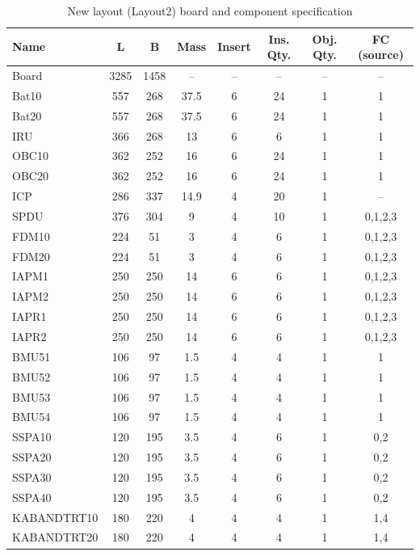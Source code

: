 \documentclass[11pt,a4paper,oneside]{report}
\begin{document}
\begin{table}[H]
\centering
\caption{New layout (Layout2) board and component specification}
\label{tab:layout_new}
\scriptsize
\begin{tabular}{|l|c|c|c|c|c|c|c|}
\hline
\textbf{Name} & \textbf{L} & \textbf{B} & \textbf{Mass} & \textbf{Insert} & \textbf{Ins. Qty.} & \textbf{Obj. Qty.} & \textbf{FC (source)} \\
\hline
Board & 3285 & 1458 & -- & -- & -- & -- & -- \\
\hline
Bat10 & 557 & 268 & 37.5 & 6 & 24 & 1 & 1 \\
\hline
Bat20 & 557 & 268 & 37.5 & 6 & 24 & 1 & 1 \\
\hline
IRU & 366 & 268 & 13 & 6 & 6 & 1 & 1 \\
\hline
OBC10 & 362 & 252 & 16 & 6 & 24 & 1 & 1 \\
\hline
OBC20 & 362 & 252 & 16 & 6 & 24 & 1 & 1 \\
\hline
ICP & 286 & 337 & 14.9 & 4 & 20 & 1 & -- \\
\hline
SPDU & 376 & 304 & 9 & 4 & 10 & 1 & 0,1,2,3 \\
\hline
FDM10 & 224 & 51 & 3 & 4 & 6 & 1 & 0,1,2,3 \\
\hline
FDM20 & 224 & 51 & 3 & 4 & 6 & 1 & 0,1,2,3 \\
\hline
IAPM1 & 250 & 250 & 14 & 6 & 6 & 1 & 0,1,2,3 \\
\hline
IAPM2 & 250 & 250 & 14 & 6 & 6 & 1 & 0,1,2,3 \\
\hline
IAPR1 & 250 & 250 & 14 & 6 & 6 & 1 & 0,1,2,3 \\
\hline
IAPR2 & 250 & 250 & 14 & 6 & 6 & 1 & 0,1,2,3 \\
\hline
BMU51 & 106 & 97 & 1.5 & 4 & 4 & 1 & 1 \\
\hline
BMU52 & 106 & 97 & 1.5 & 4 & 4 & 1 & 1 \\
\hline
BMU53 & 106 & 97 & 1.5 & 4 & 4 & 1 & 1 \\
\hline
BMU54 & 106 & 97 & 1.5 & 4 & 4 & 1 & 1 \\
\hline
SSPA10 & 120 & 195 & 3.5 & 4 & 6 & 1 & 0,2 \\
\hline
SSPA20 & 120 & 195 & 3.5 & 4 & 6 & 1 & 0,2 \\
\hline
SSPA30 & 120 & 195 & 3.5 & 4 & 6 & 1 & 0,2 \\
\hline
SSPA40 & 120 & 195 & 3.5 & 4 & 6 & 1 & 0,2 \\
\hline
KABANDTRT10 & 180 & 220 & 4 & 4 & 4 & 1 & 1,4 \\
\hline
KABANDTRT20 & 180 & 220 & 4 & 4 & 4 & 1 & 1,4 \\

\end{tabular}
\end{table}
\end{document}
